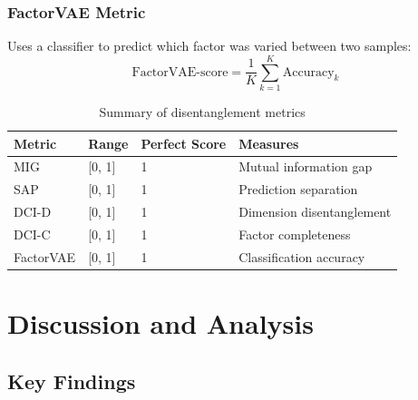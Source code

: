 \documentclass[conference]{IEEEtran}
\begin{document}
\subsubsection{FactorVAE Metric}

Uses a classifier to predict which factor was varied between two samples:
\begin{equation}
\text{FactorVAE-score} = \frac{1}{K} \sum_{k=1}^{K} \text{Accuracy}_k
\end{equation}

\begin{table}[H]
\centering
\begin{tabular}{@{}llll@{}}
\toprule
\textbf{Metric} & \textbf{Range} & \textbf{Perfect Score} & \textbf{Measures} \\ \midrule
MIG & [0, 1] & 1 & Mutual information gap \\
SAP & [0, 1] & 1 & Prediction separation \\
DCI-D & [0, 1] & 1 & Dimension disentanglement \\
DCI-C & [0, 1] & 1 & Factor completeness \\
FactorVAE & [0, 1] & 1 & Classification accuracy \\ \bottomrule
\end{tabular}
\caption{Summary of disentanglement metrics}
\label{tab:disentangle_metrics}
\end{table}

\section{Discussion and Analysis}

\subsection{Key Findings}
\end{document}
